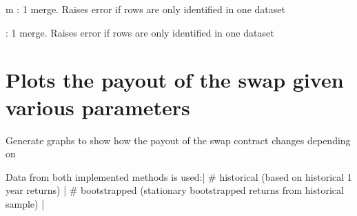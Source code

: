\documentclass[a4paper,11pt,english]{sphinxmanual}
\begin{document}

\begin{fulllineitems}
\label{\detokenize{simulation_analysis:src.simulation_analysis.utility.merge_many_to_one_metadata}}
\sphinxAtStartPar
m : 1 merge. Raises error if rows are only identified
in one dataset

\end{fulllineitems}


\begin{fulllineitems}
\label{\detokenize{simulation_analysis:src.simulation_analysis.utility.merge_one_to_one_metadata}}
 : 1 merge. Raises error if rows are only identified
in one dataset

\end{fulllineitems}



\section{Plots the payout of the swap given various parameters}
\label{\detokenize{simulation_analysis:plots-the-payout-of-the-swap-given-various-parameters}}\label{\detokenize{simulation_analysis:module-src.simulation_analysis.task_swap_payout_analysis}}
\sphinxAtStartPar
Generate graphs to show how the
payout of the swap contract changes
depending on

\sphinxAtStartPar
Data from both implemented methods is used:|
\# historical (based on historical 1 year returns) |
\# bootstrapped (stationary bootstrapped returns from historical sample) |
\end{document}
